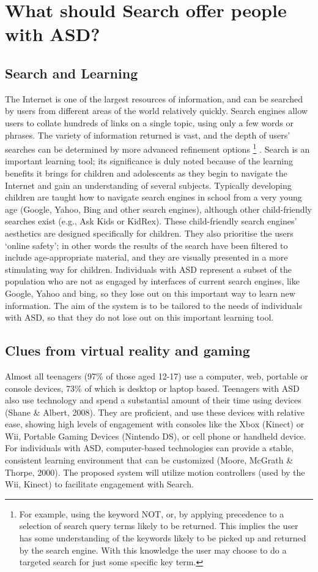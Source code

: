 \documentclass[11pt]{article}
\begin{document}
\section{What should Search offer people with ASD?}
\subsection{Search and Learning}
The Internet is one of the largest resources of information, and can be searched by users from different areas of the world relatively quickly. Search engines allow users to collate hundreds of links on a single topic, using only a few words or phrases. The variety of information returned is vast, and the depth of users’ searches can be determined by more advanced refinement options \footnote{For example, using the keyword NOT, or, by applying precedence to a selection of search query terms likely to be returned. This implies the user has some understanding of the keywords likely to be picked up and returned by the search engine. With this knowledge the user may choose to do a targeted search for just some specific key term.} . Search is an important learning tool; its significance is duly noted because of the learning benefits it brings for children and adolescents as they begin to navigate the Internet and gain an understanding of several subjects. 
Typically developing children are taught how to navigate search engines in school from a very young age (Google, Yahoo, Bing and other search engines), although other child-friendly searches exist (e.g., Ask Kids or KidRex). These child-friendly search engines’ aesthetics are designed specifically for children. They also prioritise the users ‘online safety’; in other words the results of the search have been filtered to include age-appropriate material, and they are visually presented in a more stimulating way for children.  Individuals with ASD represent a subset of the population who are not as engaged by interfaces of current search engines, like Google, Yahoo and bing, so they lose out on this important way to learn new information. The aim of the system is to be tailored to the needs of individuals with ASD, so that they do not lose out on this important learning tool.

\subsection{Clues from virtual reality and gaming}
Almost all teenagers (97\% of those aged 12-17) use a computer, web, portable or console devices, 73\% of which is desktop or laptop based. Teenagers with ASD also use technology and spend a substantial amount of their time using devices (Shane \& Albert, 2008). They are proficient, and use these devices with relative ease, showing high levels of engagement with consoles like the Xbox (Kinect) or Wii, Portable Gaming Devices (Nintendo DS), or cell phone or handheld device. For individuals with ASD, computer-based technologies can provide a stable, consistent learning environment that can be customized (Moore, McGrath \& Thorpe, 2000). The proposed system will utilize motion controllers (used by the Wii, Kinect) to facilitate engagement with Search. 
\end{document}

